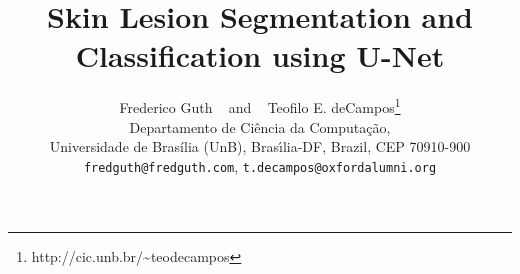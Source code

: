 \documentclass{article}
\title{Skin Lesion Segmentation and Classification using U-Net}
\author{
  Frederico Guth ~ and ~ Teofilo E. deCampos\thanks{http://cic.unb.br/\~{}teodecampos}\\
  Departamento de Ciência da Computação,\\
  Universidade de Brasília (UnB), Bras\'{\i}lia-DF, Brazil, CEP 70910-900 \\
  \texttt{fredguth@fredguth.com}, \texttt{t.decampos@oxfordalumni.org}
}
\begin{document}

\maketitle

\begin{abstract}
  
\end{abstract}






\medskip

\small


\end{document}
